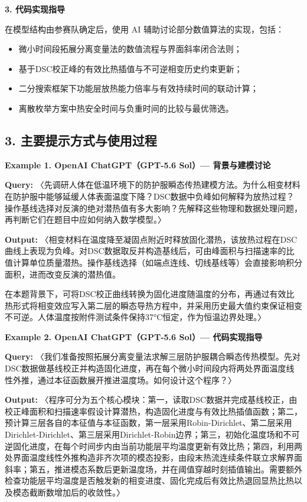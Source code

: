 \noindent\textbf{3. 代码实现指导}\par
在模型结构由参赛队确定后，使用 AI 辅助讨论部分数值算法的实现，包括：
\begin{itemize}
  \item 微小时间段拓展分离变量法的数值流程与界面斜率闭合法则；
  \item 基于DSC校正峰的有效比热插值与不可逆相变历史约束更新；
  \item 二分搜索框架下功能层放热能力倍率与有效持续时间的联动计算；
  \item 离散枚举方案中热安全时间与负重时间的比较与最优筛选。
\end{itemize}

\subsection*{3. 主要提示方式与使用过程}

\noindent\textbf{Example 1. OpenAI ChatGPT（GPT-5.6 Sol）— 背景与建模讨论}\par

\textbf{Query:} 〈先调研人体在低温环境下的防护服瞬态传热建模方法。为什么相变材料在防护服中能够延缓人体表面温度下降？DSC数据中负峰如何解释为放热过程？操作基线选择对反演的绝对潜热值有多大影响？先解释这些物理和数据处理问题，再判断它们在题目中应如何纳入数学模型。〉

\textbf{Output:} 〈相变材料在温度降至凝固点附近时释放固化潜热，该放热过程在DSC曲线上表现为负峰。对DSC数据取反并构造基线后，可由峰面积与扫描速率的比值计算单位质量潜热。操作基线选择（如端点连线、切线基线等）会直接影响积分面积，进而改变反演的潜热值。

在本题背景下，可将DSC校正曲线转换为固化进度随温度的分布，再通过有效比热形式将相变效应写入第二层的瞬态导热方程中，并采用历史最大值约束保证相变不可逆。人体温度按附件测试条件保持37°C恒定，作为恒温边界处理。〉

\noindent\textbf{Example 2. OpenAI ChatGPT（GPT-5.6 Sol）— 代码实现指导}\par

\textbf{Query:} 〈我们准备按照拓展分离变量法求解三层防护服耦合瞬态传热模型。先对DSC数据做基线校正并构造固化进度，再在每个微小时间段内将两处界面温度线性外推，通过本征函数展开推进温度场。如何设计这个程序？〉

\textbf{Output:} 〈程序可分为五个核心模块：第一，读取DSC数据并完成基线校正，由校正峰面积和扫描速率假设计算潜热，构造固化进度与有效比热插值函数；第二，预计算三层各自的本征值与本征函数，第一层采用Robin-Dirichlet、第二层采用Dirichlet-Dirichlet、第三层采用Dirichlet-Robin边界；第三，初始化温度场和不可逆固化进度，在每个时间步内由当前功能层平均温度更新有效比热；第四，利用两处界面温度线性外推构造非齐次项的模态投影，由段末热流连续条件联立求解界面斜率；第五，推进模态系数后更新温度场，并在阈值穿越时刻插值输出。需要额外检查功能层平均温度是否触发新的相变进度、固化完成后有效比热退回显热比热以及模态截断数增加后的收敛性。〉

